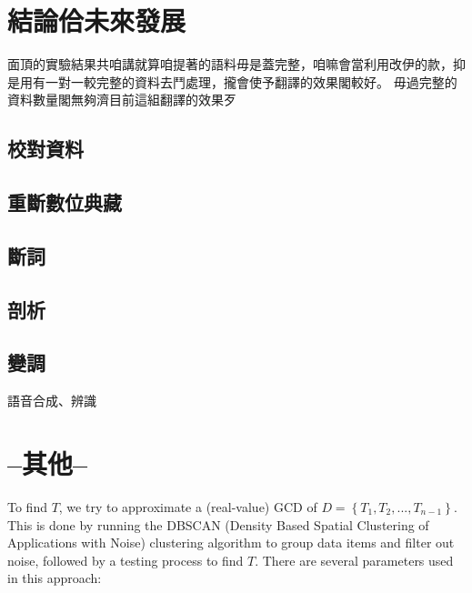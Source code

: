 \documentclass[final,oneside,onecolumn,12pt,a4paper]{book}%
\begin{document}
\chapter{結論佮未來發展}
\label{章：結論佮未來發展}
面頂的實驗結果共咱講就算咱提著的語料毋是蓋完整，咱嘛會當利用改伊的款，抑是用有一對一較完整的資料去鬥處理，攏會使予翻譯的效果閣較好。
毋過完整的資料數量閣無夠濟目前這組翻譯的效果歹
\section{校對資料}
\label{節：校對資料}

\section{重斷數位典藏}
\label{節：重斷數位典藏}

\section{斷詞}
\label{節：斷詞}

\section{剖析}
\label{節：剖析}


\section{變調}語音合成、辨識
\label{節：變調}

\chapter{--其他--}
To find $T$, we try to approximate a (real-value) GCD of $D=\left\{
T_{1},T_{2},...,T_{n-1}\right\}  $. This is done by running the DBSCAN
(Density Based Spatial Clustering of Applications with Noise) clustering
algorithm \cite{Ester1996DBSCAN} to group data items and filter out noise,
followed by a testing process to find $T$. There are several parameters used
in this approach:
\end{document}
